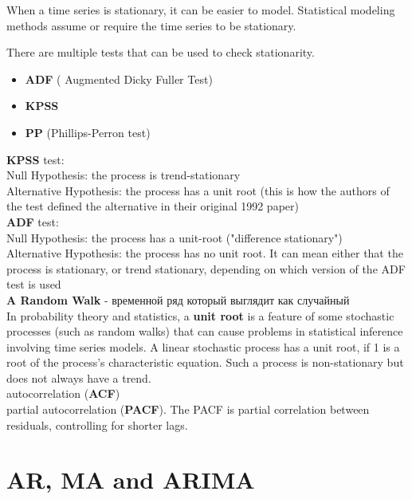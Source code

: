 \documentclass{book}
\begin{document}
When a time series is stationary, it can be easier to model. Statistical modeling methods assume or require the time series to be stationary.

There are multiple tests that can be used to check stationarity.

\begin{itemize}
\item \textbf{ADF} ( Augmented Dicky Fuller Test)
\item \textbf{KPSS} 
\item \textbf{PP} (Phillips-Perron test)
\end{itemize}

\textbf{KPSS} test:\\
Null Hypothesis: the process is trend-stationary\\
Alternative Hypothesis: the process has a unit root (this is how the authors of the test defined the alternative in their original 1992 paper)\\
\textbf{ADF} test:\\
Null Hypothesis: the process has a unit-root ("difference stationary")\\
Alternative Hypothesis: the process has no unit root. It can mean either that the process is stationary, or trend stationary, depending on which version of the ADF test is used\\

\textbf{A Random Walk}  - временной ряд который выглядит как случайный\\

In probability theory and statistics, a \textbf{unit root}  is a feature of some stochastic processes (such as random walks) that can cause problems in statistical inference involving time series models. A linear stochastic process has a unit root, if 1 is a root of the process's characteristic equation. Such a process is non-stationary but does not always have a trend.\\

autocorrelation (\textbf{ACF})\\
partial autocorrelation (\textbf{PACF}). The PACF is partial correlation between residuals, controlling for shorter lags.

\section{AR, MA and ARIMA}
\end{document}
